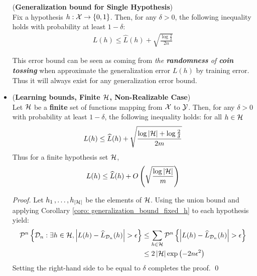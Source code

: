 \documentclass[11pt]{article}
\begin{document}
\begin{itemize}
\begin{corollary} \label{coro: generalization_bound_fixed_h} (\textbf{Generalization bound for Single Hypothesis})  \citep{mohri2018foundations}\\
Fix a hypothesis $h: {\mathcal X} \to \left\{0, 1\right\}$. Then, for any $\delta > 0$, the following inequality holds with probability at least $1 - \delta$:
\begin{align}
 L(h) \le  \widehat{L}(h) + \sqrt{\frac{\log\frac{2}{\delta}}{2n}}  \label{eqn: pac_one_hypothesis}
\end{align}
\end{corollary} This error bound can be seen as coming from \emph{the \textbf{randomness} of \textbf{coin tossing}} when approximate the generalization error $L(h)$ by training error. Thus it will always exist for any generalization error bound. 

\item \begin{proposition} (\textbf{Learning bounds, Finite ${\mathcal H}$, Non-Realizable Case}) \citep{mohri2018foundations}\\
Let ${\mathcal H}$ be a \textbf{finite} set of functions mapping from ${\mathcal X}$ to ${\mathcal Y}$.  Then, for any $\delta > 0$ with probability at least $1 - \delta$, the following inequality holds: for all $h \in {\mathcal H}$
\begin{align}
 L(h) \le  \widehat{L}(h) + \sqrt{\frac{\log\left\lvert {\mathcal H} \right\rvert + \log\frac{2}{\delta}}{2m}}  \label{eqn: pac_finite_case_consistency}
\end{align} Thus for a finite hypothesis set ${\mathcal H}$, 
\begin{align}
 L(h) \le  \widehat{L}(h) + O\left(\sqrt{\frac{\log\left\lvert {\mathcal H} \right\rvert}{m}}\right)  \label{eqn: pac_finite_case_consistency_bigO}
\end{align}
\end{proposition}
\begin{proof}
Let $h_1 \,{,}\ldots{,}\, h_{\left\lvert {\mathcal H} \right\rvert}$ be the elements of ${\mathcal H}$. Using the union bound and applying Corollary \ref{coro: generalization_bound_fixed_h} to each hypothesis yield:
\begin{align*}
{\mathcal P}^n\left\{{\mathcal D}_n: \exists h\in {\mathcal H},  \left\lvert L(h) - \widehat{L}_{{\mathcal D}_n}(h) \right\rvert > \epsilon \right\} &\le \sum_{h \in {\mathcal H}}{\mathcal P}^n\left\{\left\lvert L(h) - \widehat{L}_{{\mathcal D}_n}(h) \right\rvert > \epsilon\right\}\\
&\le 2\left\lvert {\mathcal H} \right\rvert \exp\left(-2n\epsilon^2\right) 
\end{align*} Setting the right-hand side to be equal to $\delta$ completes the proof. \qed
\end{proof}


\end{itemize}
\end{document}
